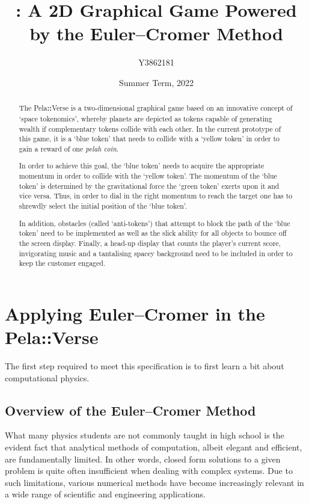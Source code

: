 \documentclass[11pt]{article}
\title{\pelahverse{}: A 2D Graphical Game Powered by the Euler--Cromer Method}
\author{Y3862181}
\date{Summer Term, 2022}
\newcommand{\pelahverse}{Pela\hspace*{1pt}\textbf{::}Verse}
\begin{document}
\maketitle

\begin{abstract}
\noindent
The \pelahverse{} is a two-dimensional graphical game based on an innovative concept of `space tokenomics', whereby planets are depicted as tokens capable of generating wealth if complementary tokens collide with each other. In the current prototype of this game, it is a `blue token' that needs to collide with a `yellow token' in order to gain a reward of one \textit{pelah coin}. 

In order to achieve this goal, the `blue token' needs to acquire the appropriate momentum in order to collide with the `yellow token'. The momentum of the `blue token' is determined by the gravitational force the `green token' exerts upon it and vice versa. Thus, in order to dial in the right momentum to reach the target one has to shrewdly select the initial position of the `blue token'.

In addition, obstacles (called `anti-tokens') that attempt to block the path of the `blue token' need to be implemented as well as the slick ability for all objects to bounce off the screen display. Finally, a head-up display that counts the player's current score, invigorating music and a tantalising spacey background need to be included in order to keep the customer engaged.


\end{abstract}



\section{Applying Euler--Cromer in the \pelahverse{}}
\pagestyle{content}
The first step required to meet this specification is to first learn a bit about computational physics.
\subsection{Overview of the Euler--Cromer Method}

What many physics students are not commonly taught in high school is the evident fact that analytical methods of computation, albeit elegant and efficient, are fundamentally limited. In other words, closed form solutions to a given problem is quite often insufficient when dealing with complex systems. Due to such limitations, various numerical methods have become increasingly relevant in a wide range of scientific and engineering applications. 
\end{document}
